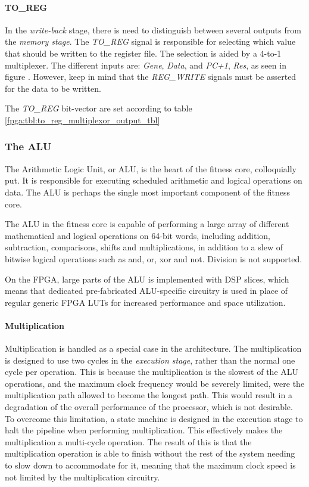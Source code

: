 

\paragraph{TO\_REG}
In the \emph{write-back} stage, there is need to distinguish between several outputs from the \emph{memory stage}.
The \emph{TO\_REG} signal is responsible for selecting which value that should be written to the register file.
The selection is aided by a 4-to-1 multiplexer.
The different inputs are: \emph{Gene}, \emph{Data}, and \emph{PC+1}, \emph{Res}, as seen in figure .
However, keep in mind that the \emph{REG\_WRITE} signals must be asserted for the data to be written. 

The \emph{TO\_REG} bit-vector are set according to table \ref{fpga:tbl:to_reg_multiplexor_output_tbl}




\newpage
\subsubsection{The ALU}

The Arithmetic Logic Unit, or ALU, is the heart of the fitness core, colloquially put.
It is responsible for executing scheduled arithmetic and logical operations on data.
The ALU is perhaps the single most important component of the fitness core.

The ALU in the fitness core is capable of performing a large array of different mathematical and logical operations on 64-bit words, including addition, subtraction, comparisons, shifts and multiplications, in addition to a slew of bitwise logical operations such as and, or, xor and not.
Division is not supported.

On the FPGA, large parts of the ALU is implemented with \glspl{DSP slice}, which means that dedicated pre-fabricated ALU-specific circuitry is used in place of regular generic \gls{FPGA} \glspl{LUT} for increased performance and space utilization.

\paragraph{Multiplication}

Multiplication is handled as a special case in the architecture.
The multiplication is designed to use two cycles in the \emph{execution stage}, rather than the normal one cycle per operation.
This is because the multiplication is the slowest of the ALU operations, and the maximum clock frequency would be severely limited, were the multiplication path allowed to become the longest path.
This would result in a degradation of the overall performance of the processor, which is not desirable.
To overcome this limitation, a state machine is designed in the execution stage to halt the pipeline when performing multiplication.
This effectively makes the multiplication a multi-cycle operation.
The result of this is that the multiplication operation is able to finish without the rest of the system needing to slow down to accommodate for it, meaning that the maximum clock speed is not limited by the multiplication circuitry.

